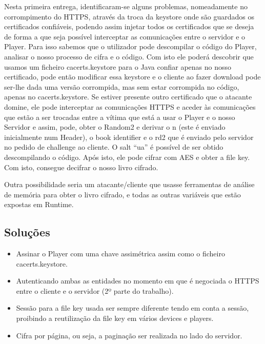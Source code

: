 \documentclass[pdftex,12pt,a4paper]{report}
\begin{document}
Nesta primeira entrega, identificaram-se alguns problemas, nomeadamente no corrompimento do HTTPS, através da troca da keystore onde são guardados os certificados confiáveis, podendo assim injetar todos os certificados que se deseja de forma a que seja possível interceptar as comunicações entre o servidor e o Player. Para isso sabemos que o utilizador pode descompilar o código do Player, analisar o nosso processo de cifra e o código. Com isto ele poderá descobrir que usamos um ficheiro cacerts.keystore para o Java confiar apenas no nosso certificado, pode então modificar essa keystore e o cliente ao fazer download pode ser-lhe dada uma versão corrompida, mas sem estar corrompida no código, apenas no cacerts.keystore. Se estiver presente outro certificado que o atacante domine, ele pode interceptar as comunicações HTTPS e aceder às comunicações que estão a ser trocadas entre a vítima que está a usar o Player e o nosso Servidor e assim, pode, obter o Random2 e derivar o n (este é enviado inicialmente num Header), o book identifier e o rd2 que é enviado pelo servidor no pedido de challenge ao cliente. O salt “ua” é possível de ser obtido descompilando o código. Após isto, ele pode cifrar com AES e obter a file key. Com isto, consegue decifrar o nosso livro cifrado.

Outra possibilidade seria um atacante/cliente que usasse ferramentas de análise de memória para obter o livro cifrado, e todas as outras variáveis que estão expostas em Runtime.

\subsection{Soluções}

\begin{itemize}
\item Assinar o Player com uma chave assimétrica assim como o ficheiro cacerts.keystore.
\item Autenticando ambas as entidades no momento em que é negociada o HTTPS entre o cliente e o servidor (2º parte do trabalho).
\item Sessão para a file key usada ser sempre diferente tendo em conta a sessão, proibindo a reutilização da file key em vários devices e players.
\item Cifra por página, ou seja, a paginação ser realizada no lado do servidor.
\end{itemize}
\end{document}
